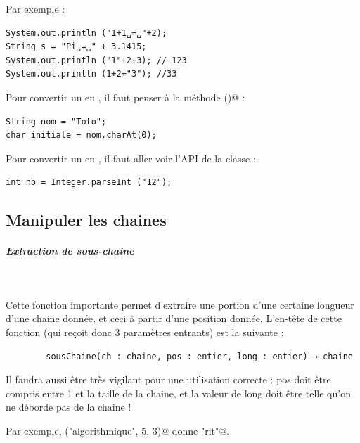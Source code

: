 \documentclass[11pt,a4paper]{article}
\begin{document}
            \par
        Par exemple :
            \par
        \begin{verbatim}
System.out.println ("1+1␣=␣"+2);
String s = "Pi␣=␣" + 3.1415;
System.out.println ("1"+2+3); // 123
System.out.println (1+2+"3"); //33
      \end{verbatim}
		    Pour convertir un \verb@String@ en \verb@char@ , 
		    il faut penser \`a la m\'ethode \verb@charAt()@ :
      
            \par
        \begin{verbatim}
String nom = "Toto";
char initiale = nom.charAt(0);
      \end{verbatim}
		    Pour convertir un \verb@String@ en \verb@int@ , 
		    il faut aller voir l'API de la classe \verb@Integer@ :
      
            \par
        \begin{verbatim}
int nb = Integer.parseInt ("12");
      \end{verbatim}\subsection{Manipuler les chaines}
			
		\subparagraph{Extraction de sous-chaine} 
		
					\textcolor{white}{.} \par
				
        Cette fonction importante permet d'extraire une portion d'une certaine longueur d'une
        chaine donn\'ee, et ceci \`a partir d'une position donn\'ee. L'en-t\^ete de cette fonction (qui re\c coit
        donc 3 param\`etres entrants) est la suivante :
       
            \par
        \begin{verbatim}
        sousChaine(ch : chaine, pos : entier, long : entier) → chaine
      \end{verbatim}
        Il faudra aussi \^etre tr\`es vigilant pour une utilisation correcte : pos doit \^etre compris entre 1
        et la taille de la chaine, et la valeur de long doit \^etre telle qu'on ne d\'eborde pas de la chaine !
      
            \par
        
        Par exemple, \verb@sousChaine("algorithmique", 5, 3)@ donne \verb@"rit"@.
      
\end{document}

